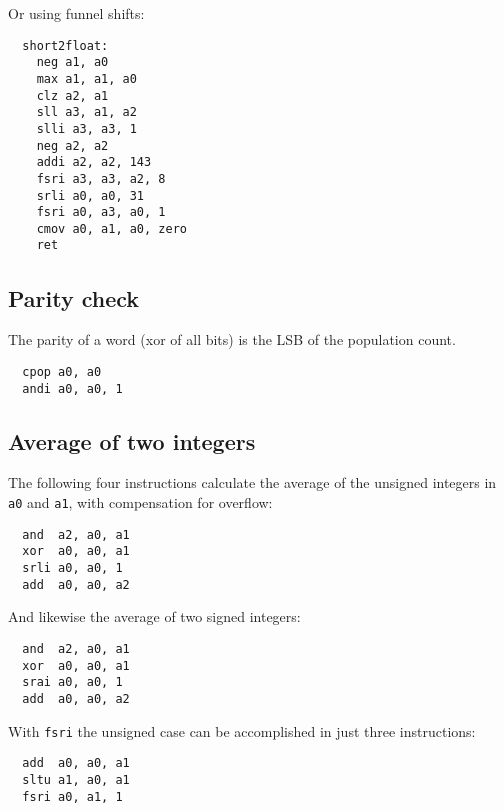 Or using funnel shifts:

\begin{minipage}{\linewidth}
\begin{verbatim}
  short2float:
    neg a1, a0
    max a1, a1, a0
    clz a2, a1
    sll a3, a1, a2
    slli a3, a3, 1
    neg a2, a2
    addi a2, a2, 143
    fsri a3, a3, a2, 8
    srli a0, a0, 31
    fsri a0, a3, a0, 1
    cmov a0, a1, a0, zero
    ret
\end{verbatim}
\end{minipage}


\subsection{Parity check}

The parity of a word (xor of all bits) is the LSB of the population count.

\begin{verbatim}
  cpop a0, a0
  andi a0, a0, 1
\end{verbatim}


\subsection{Average of two integers}

The following four instructions calculate the average of the unsigned
integers in {\tt a0} and {\tt a1}, with compensation for overflow:

\begin{verbatim}
  and  a2, a0, a1
  xor  a0, a0, a1
  srli a0, a0, 1
  add  a0, a0, a2
\end{verbatim}

And likewise the average of two signed integers:

\begin{verbatim}
  and  a2, a0, a1
  xor  a0, a0, a1
  srai a0, a0, 1
  add  a0, a0, a2
\end{verbatim}

With {\tt fsri} the unsigned case can be accomplished in just three
instructions:

\begin{verbatim}
  add  a0, a0, a1
  sltu a1, a0, a1
  fsri a0, a1, 1
\end{verbatim}

